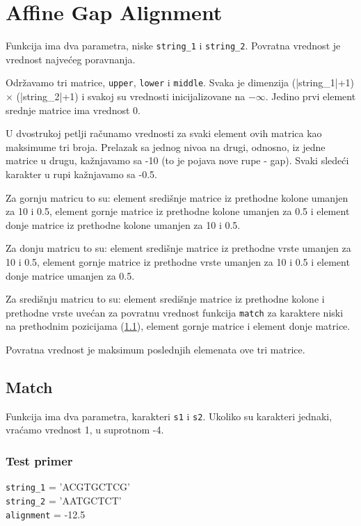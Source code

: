 \section{Affine Gap Alignment}

Funkcija ima dva parametra, niske \texttt{string\_1} i \texttt{string\_2}. Povratna vrednost je vrednost najvećeg poravnanja.

Održavamo tri matrice, \texttt{upper}, \texttt{lower} i \texttt{middle}. Svaka je dimenzija (|string\_1|+1) $\times$ (|string\_2|+1) i svakoj su vrednosti inicijalizovane na $-\infty$. Jedino prvi element srednje matrice ima vrednost 0. 


U dvostrukoj petlji računamo vrednosti za svaki element ovih matrica kao maksimume tri broja. Prelazak sa jednog nivoa na drugi, odnosno, iz jedne matrice u drugu, kažnjavamo sa -10 (to je pojava nove rupe - gap). Svaki sledeći karakter u rupi kažnjavamo sa -0.5. 

Za gornju matricu to su: element središnje matrice iz prethodne kolone umanjen za 10 i 0.5, element gornje matrice iz prethodne kolone umanjen za 0.5 i element donje matrice iz prethodne kolone umanjen za 10 i 0.5. 

Za donju matricu to su: element središnje matrice iz prethodne vrste umanjen za 10 i 0.5, element gornje matrice iz prethodne vrste umanjen za 10 i 0.5 i element donje matrice umanjen za 0.5. 

Za središnju matricu to su: element središnje matrice iz prethodne kolone i prethodne vrste uvećan za povratnu vrednost funkcija \texttt{match} za karaktere niski na prethodnim pozicijama (\ref{match2}), element gornje matrice i element donje matrice. 

Povratna vrednost je maksimum poslednjih elemenata ove tri matrice.



\subsection{Match}
\label{match2}

Funkcija ima dva parametra, karakteri \texttt{s1} i \texttt{s2}. Ukoliko su karakteri jednaki, vraćamo vrednost 1, u suprotnom -4.



\subsubsection{Test primer}

\noindent \texttt{string\_1} = 'ACGTGCTCG'
\\\texttt{string\_2} = 'AATGCTCT'
\\\texttt{alignment} = -12.5
